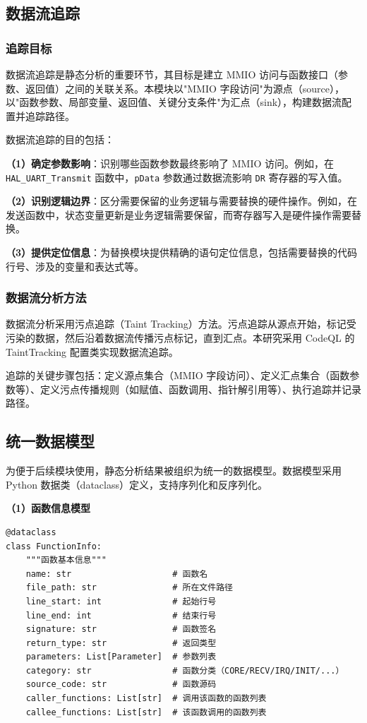 \subsection{数据流追踪}

\subsubsection{追踪目标}

数据流追踪是静态分析的重要环节，其目标是建立 MMIO 访问与函数接口（参数、返回值）之间的关联关系。本模块以"MMIO 字段访问"为源点（source），以"函数参数、局部变量、返回值、关键分支条件"为汇点（sink），构建数据流配置并追踪路径。

数据流追踪的目的包括：

\textbf{（1）确定参数影响}：识别哪些函数参数最终影响了 MMIO 访问。例如，在 \texttt{HAL\_UART\_Transmit} 函数中，\texttt{pData} 参数通过数据流影响 \texttt{DR} 寄存器的写入值。

\textbf{（2）识别逻辑边界}：区分需要保留的业务逻辑与需要替换的硬件操作。例如，在发送函数中，状态变量更新是业务逻辑需要保留，而寄存器写入是硬件操作需要替换。

\textbf{（3）提供定位信息}：为替换模块提供精确的语句定位信息，包括需要替换的代码行号、涉及的变量和表达式等。

\subsubsection{数据流分析方法}

数据流分析采用污点追踪（Taint Tracking）方法。污点追踪从源点开始，标记受污染的数据，然后沿着数据流传播污点标记，直到汇点。本研究采用 CodeQL 的 TaintTracking 配置类实现数据流追踪。

追踪的关键步骤包括：定义源点集合（MMIO 字段访问）、定义汇点集合（函数参数等）、定义污点传播规则（如赋值、函数调用、指针解引用等）、执行追踪并记录路径。

\subsection{统一数据模型}

为便于后续模块使用，静态分析结果被组织为统一的数据模型。数据模型采用 Python 数据类（dataclass）定义，支持序列化和反序列化。

\textbf{（1）函数信息模型}

\begin{lstlisting}[style=CStyle,abovecaptionskip=0pt,belowcaptionskip=0pt]
@dataclass
class FunctionInfo:
    """函数基本信息"""
    name: str                    # 函数名
    file_path: str               # 所在文件路径
    line_start: int              # 起始行号
    line_end: int                # 结束行号
    signature: str               # 函数签名
    return_type: str             # 返回类型
    parameters: List[Parameter]  # 参数列表
    category: str                # 函数分类（CORE/RECV/IRQ/INIT/...）
    source_code: str             # 函数源码
    caller_functions: List[str]  # 调用该函数的函数列表
    callee_functions: List[str]  # 该函数调用的函数列表
\end{lstlisting}

